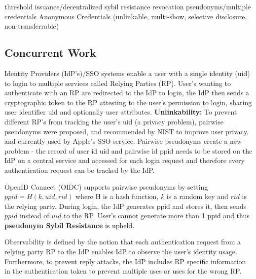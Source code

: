 threshold issuance/decentralized
sybil resistance
revocation
pseudonyms/multiple credentials
Anonymous Credentials (unlinkable, multi-show, selective disclosure, non-transferrable)











\subsection{Concurrent Work}
Identity Providers (IdP's)/SSO systems enable a user with a single identity (uid) to login to multiple services called Relying Parties (RP). User's wanting to authenticate with an RP are redirected to the IdP to login, the IdP then sends a cryptographic token to the RP attesting to the user's permission to login, sharing user identifier uid and optionally user attributes.
\textbf{Unlinkability:} To prevent different RP's from tracking the user's uid (a privacy problem), pairwise pseudonyms were proposed, and recommended by NIST to improve user privacy, and currently used by Apple's SSO service. Pairwise pseudonyms create a new problem - the record of user id uid and pairwise id ppid needs to be stored on the IdP on a central service and accessed for each login request and therefore every authentication request can be tracked by the IdP. 

OpenID Connect (OIDC) supports pairwise pseudonyms by setting $ppid = H(k, uid, rid)$ where H is a hash function, $k$ is a random key and $rid$ is the relying party. During login, the IdP generates ppid and stores it, then sends $ppid$ instead of $uid$ to the RP. User's cannot generate more than 1 ppid and thus \textbf{pseudonym Sybil Resistance} is upheld. 

Observability is defined by the notion that each authentication request from a relying party RP to the IdP enables IdP to observe the user's identity usage. Furthermore, to prevent reply attacks, the IdP includes RP specific information in the authentication token to prevent multiple uses or uses for the wrong RP.

